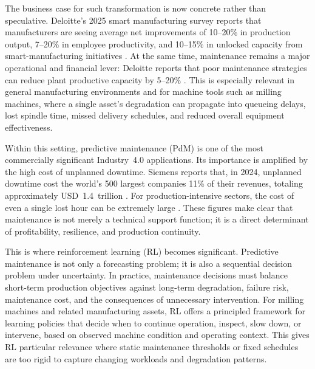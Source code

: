 \documentclass[12pt,oneside]{book}
\begin{document}

The business case for such transformation is now concrete rather than speculative. Deloitte's 2025 smart manufacturing survey reports that manufacturers are seeing average net improvements of 10--20\% in production output, 7--20\% in employee productivity, and 10--15\% in unlocked capacity from smart-manufacturing initiatives \citep{Deloitte2025Survey}. At the same time, maintenance remains a major operational and financial lever: Deloitte reports that poor maintenance strategies can reduce plant productive capacity by 5--20\% \citep{Deloitte2025Survey}. This is especially relevant in general manufacturing environments and for machine tools such as milling machines, where a single asset's degradation can propagate into queueing delays, lost spindle time, missed delivery schedules, and reduced overall equipment effectiveness.

Within this setting, predictive maintenance (PdM) is one of the most commercially significant Industry~4.0 applications. Its importance is amplified by the high cost of unplanned downtime. Siemens reports that, in 2024, unplanned downtime cost the world's 500 largest companies 11\% of their revenues, totaling approximately USD~1.4~trillion \citep{SiemensDowntime2024}. For production-intensive sectors, the cost of even a single lost hour can be extremely large \citep{SiemensDowntime2024}. These figures make clear that maintenance is not merely a technical support function; it is a direct determinant of profitability, resilience, and production continuity.

This is where reinforcement learning (RL) becomes significant. Predictive maintenance is not only a forecasting problem; it is also a sequential decision problem under uncertainty. In practice, maintenance decisions must balance short-term production objectives against long-term degradation, failure risk, maintenance cost, and the consequences of unnecessary intervention. For milling machines and related manufacturing assets, RL offers a principled framework for learning policies that decide when to continue operation, inspect, slow down, or intervene, based on observed machine condition and operating context. This gives RL particular relevance where static maintenance thresholds or fixed schedules are too rigid to capture changing workloads and degradation patterns.
\end{document}
